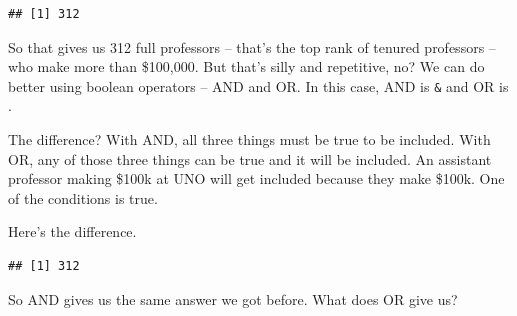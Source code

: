 \documentclass[]{book}
\newenvironment{Shaded}{\begin{snugshade}}{\end{snugshade}}
\newcommand{\DataTypeTok}[1]{\textcolor[rgb]{0.13,0.29,0.53}{#1}}
\newcommand{\DecValTok}[1]{\textcolor[rgb]{0.00,0.00,0.81}{#1}}
\newcommand{\KeywordTok}[1]{\textcolor[rgb]{0.13,0.29,0.53}{\textbf{#1}}}
\newcommand{\NormalTok}[1]{#1}
\newcommand{\OperatorTok}[1]{\textcolor[rgb]{0.81,0.36,0.00}{\textbf{#1}}}
\newcommand{\StringTok}[1]{\textcolor[rgb]{0.31,0.60,0.02}{#1}}
\begin{document}
\begin{verbatim}
## [1] 312
\end{verbatim}

So that gives us 312 full professors -- that's the top rank of tenured professors -- who make more than \$100,000. But that's silly and repetitive, no? We can do better using boolean operators -- AND and OR. In this case, AND is \texttt{\&} and OR is \texttt{\textbar{}}.

The difference? With AND, all three things must be true to be included. With OR, any of those three things can be true and it will be included. An assistant professor making \$100k at UNO will get included because they make \$100k. One of the conditions is true.

Here's the difference.

\begin{Shaded}
\end{Shaded}

\begin{verbatim}
## [1] 312
\end{verbatim}

So AND gives us the same answer we got before. What does OR give us?

\begin{Shaded}
\end{Shaded}
\end{document}
